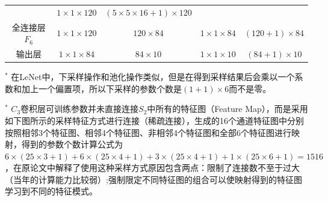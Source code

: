 \documentclass[12pt,a4paper,UTF8,twoside]{book}
\begin{document}
\begin{longtable}[]{@{}ccccc@{}}
\begin{minipage}[t]{0.19\columnwidth}
\end{minipage} & \begin{minipage}[t]{0.16\columnwidth}\centering
\(1\times1\times120\)\strut
\end{minipage} & \begin{minipage}[t]{0.24\columnwidth}\centering
\((5\times5\times16+1)\times120\)\strut
\end{minipage}\tabularnewline
\begin{minipage}[t]{0.12\columnwidth}\centering
全连接层\(F_6\)\strut
\end{minipage} & \begin{minipage}[t]{0.16\columnwidth}\centering
\(1\times1\times120\)\strut
\end{minipage} & \begin{minipage}[t]{0.19\columnwidth}\centering
\(120\times84\)\strut
\end{minipage} & \begin{minipage}[t]{0.16\columnwidth}\centering
\(1\times1\times84\)\strut
\end{minipage} & \begin{minipage}[t]{0.24\columnwidth}\centering
\((120+1)\times84\)\strut
\end{minipage}\tabularnewline
\begin{minipage}[t]{0.12\columnwidth}\centering
输出层\strut
\end{minipage} & \begin{minipage}[t]{0.16\columnwidth}\centering
\(1\times1\times84\)\strut
\end{minipage} & \begin{minipage}[t]{0.19\columnwidth}\centering
\(84\times10\)\strut
\end{minipage} & \begin{minipage}[t]{0.16\columnwidth}\centering
\(1\times1\times10\)\strut
\end{minipage} & \begin{minipage}[t]{0.24\columnwidth}\centering
\((84+1)\times10\)\strut
\end{minipage}\tabularnewline
\bottomrule
\end{longtable}

\(^*\) 在LeNet中，下采样操作和池化操作类似，但是在得到采样结果后会乘以一个系数和加上一个偏置项，所以下采样的参数个数是\((1+1)\times6\)而不是零。

\(^*\) \(C_3\)卷积层可训练参数并未直接连接\(S_2\)中所有的特征图（Feature Map），而是采用如下图所示的采样特征方式进行连接（稀疏连接），生成的16个通道特征图中分别按照相邻3个特征图、相邻4个特征图、非相邻4个特征图和全部6个特征图进行映射，得到的参数个数计算公式为\(6\times(25\times3+1)+6\times(25\times4+1)+3\times(25\times4+1)+1\times(25\times6+1)=1516\)，在原论文中解释了使用这种采样方式原因包含两点：限制了连接数不至于过大（当年的计算能力比较弱）;强制限定不同特征图的组合可以使映射得到的特征图学习到不同的特征模式。
\end{document}
